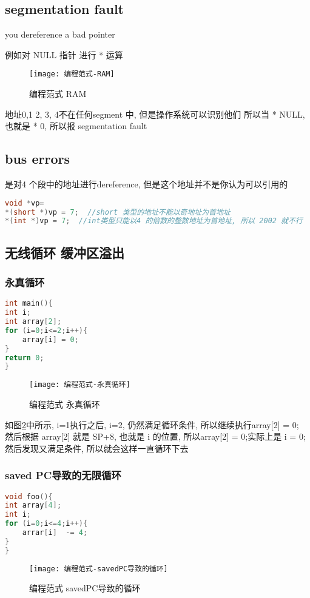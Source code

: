 \documentclass{article}
\begin{document}
\subsection{segmentation fault}
you dereference a bad pointer

例如对 NULL 指针 进行 * 运算
\begin{figure}[htbp]
	\centering
	\texttt{[image: 编程范式-RAM]}\\
	\caption{编程范式 RAM}\label{fig.编程范式.RAM}
\end{figure}

地址0,1 2, 3, 4不在任何segment 中, 但是操作系统可以识别他们
所以当 * NULL, 也就是 * 0, 所以报 segmentation fault

\subsection{bus errors}
是对4 个段中的地址进行dereference, 但是这个地址并不是你认为可以引用的
\begin{lstlisting}[language = C]
void *vp=
*(short *)vp = 7;  //short 类型的地址不能以奇地址为首地址
*(int *)vp = 7;  //int类型只能以4 的倍数的整数地址为首地址, 所以 2002 就不行
\end{lstlisting}

\subsection{无线循环 缓冲区溢出}
\subsubsection{永真循环}
\begin{lstlisting}[language = C]
int main(){
int i;
int array[2];
for (i=0;i<=2;i++){
	array[i] = 0;
}
return 0;
}
\end{lstlisting}
\begin{figure}[htbp]
	\centering
	\texttt{[image: 编程范式-永真循环]}\\
	\caption{编程范式 永真循环}\label{fig.编程范式.永真循环}
\end{figure}

如图\ref{fig.编程范式.永真循环}中所示, i=1执行之后, i=2, 仍然满足循环条件, 所以继续执行array[2] = 0;\\
然后根据 array[2] 就是 SP+8, 也就是 i 的位置, 所以array[2] = 0;实际上是 i = 0; 然后发现又满足条件, 所以就会这样一直循环下去

\subsubsection{saved PC导致的无限循环}
\begin{lstlisting}[language = C]
void foo(){
int array[4];
int i;
for (i=0;i<=4;i++){
	arrar[i]  -= 4;
}
}
\end{lstlisting}
\begin{figure}[htbp]
	\centering
	\texttt{[image: 编程范式-savedPC导致的循环]}\\
	\caption{编程范式 savedPC导致的循环}\label{fig.编程范式.savedPC导致的循环}
\end{figure}
\end{document}

